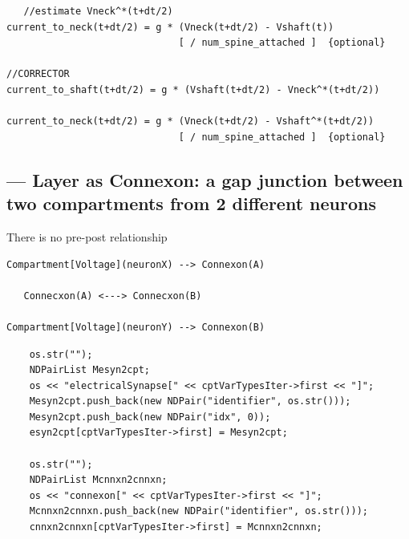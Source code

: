 \begin{enumerate}
\begin{verbatim}
   //estimate Vneck^*(t+dt/2)
current_to_neck(t+dt/2) = g * (Vneck(t+dt/2) - Vshaft(t))   
                              [ / num_spine_attached ]  {optional}

//CORRECTOR
current_to_shaft(t+dt/2) = g * (Vshaft(t+dt/2) - Vneck^*(t+dt/2))

current_to_neck(t+dt/2) = g * (Vneck(t+dt/2) - Vshaft^*(t+dt/2))   
                              [ / num_spine_attached ]  {optional}
\end{verbatim}  
  
\end{enumerate}

\subsection{--- Layer as Connexon: a gap junction between two compartments
from 2 different neurons}
\label{sec:Connexon-Layer}
\label{sec:Connecxon}



There is no pre-post relationship
\begin{verbatim}
Compartment[Voltage](neuronX) --> Connexon(A)

   Connecxon(A) <---> Connecxon(B)
   
Compartment[Voltage](neuronY) --> Connexon(B)
\end{verbatim}


\begin{verbatim}
    os.str("");
    NDPairList Mesyn2cpt;
    os << "electricalSynapse[" << cptVarTypesIter->first << "]";
    Mesyn2cpt.push_back(new NDPair("identifier", os.str()));
    Mesyn2cpt.push_back(new NDPair("idx", 0));
    esyn2cpt[cptVarTypesIter->first] = Mesyn2cpt;

    os.str("");
    NDPairList Mcnnxn2cnnxn;
    os << "connexon[" << cptVarTypesIter->first << "]";
    Mcnnxn2cnnxn.push_back(new NDPair("identifier", os.str()));
    cnnxn2cnnxn[cptVarTypesIter->first] = Mcnnxn2cnnxn;

\end{verbatim}



%



